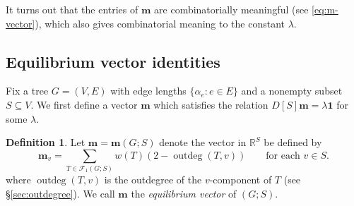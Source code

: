 \documentclass[12pt]{amsart}
\theoremstyle{definition}
\newtheorem{dfn}[thm]{Definition}
\newcommand{\RR}{\mathbb{R}}
\newcommand{\bone}{\mathbf{1}}
\newcommand{\boldm}{\mathbf{m}}
\newcommand{\tr}{\intercal}
\DeclareMathOperator{\cof}{cof}
\newcommand{\trees}{\mathcal{F}_1}
\DeclareMathOperator{\outdeg}{outdeg}
\begin{document}

	




It turns out that the entries of $\boldm$ are combinatorially meaningful (see \eqref{eq:m-vector}),
which also gives combinatorial meaning to
the constant $\lambda$.

\subsection{Equilibrium vector identities}

Fix a tree $G = (V,E)$ with edge lengths $\{\alpha_e \colon e \in E\}$ and a nonempty subset $S \subseteq V$.
We first define a vector $\boldm$ which satisfies the relation $D[S] \boldm = \lambda \bone$ for some $\lambda$.

\begin{dfn}
\label{dfn:m-vector}
Let $\boldm = \boldm(G;S)$ denote the vector in $\RR^S$ be defined by
\begin{equation}
\label{eq:m-vector}
\boldm_v =  \sum_{T \in \trees(G;S)} w({T}) (2 - \outdeg(T,v))
\qquad\text{for each }v \in S.
\end{equation}
where $\outdeg(T,v)$ is the outdegree of the $v$-component of $T$ (see \S\ref{sec:outdegree}).
We call $\boldm$ the {\em equilibrium vector} of $(G; S)$.
\end{dfn}
\end{document}
